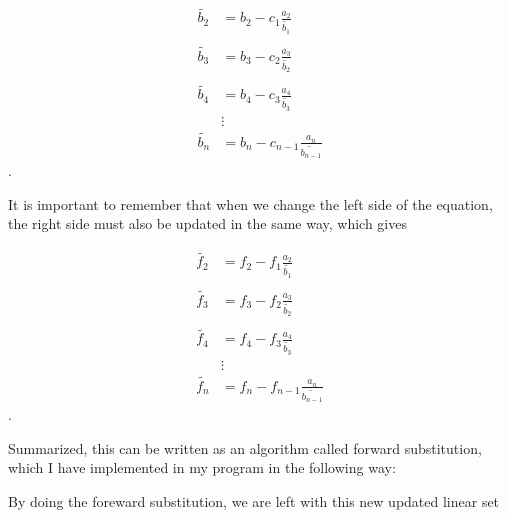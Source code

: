 \documentclass[a4paper,norsk,12pt,oneside]{article}
\begin{document}
\begin{align*}
    \tilde{b_2} &= b_2 - c_1 \frac{a_2}{\tilde{b_1}}\\\\
    \tilde{b_3} &= b_3 - c_2 \frac{a_3}{\tilde{b_2}}\\\\
    \tilde{b_4} &= b_4 - c_3 \frac{a_4}{\tilde{b_3}}\\
    &\vdots \\
    \tilde{b_n} &= b_n - c_{n-1} \frac{a_n}{\tilde{b_{n-1}}} 
\end{align*}. 

It is important to remember that when we change the left side of the equation, the right side
must also be updated in the same way, which gives 

\begin{align*}
    \tilde{f_2} &= f_2 - f_1 \frac{a_2}{\tilde{b_1}}\\\\
    \tilde{f_3} &= f_3 - f_2 \frac{a_3}{\tilde{b_2}}\\\\
    \tilde{f_4} &= f_4 - f_3 \frac{a_4}{\tilde{b_3}}\\
    &\vdots \\
    \tilde{f_n} &= f_n - f_{n-1} \frac{a_n}{\tilde{b_{n-1}}} 
\end{align*}.

Summarized, this can be written as an algorithm called forward substitution,
which I have implemented in my program in the following way:



By doing the foreward substitution, we are left with this new updated linear set
\end{document}
